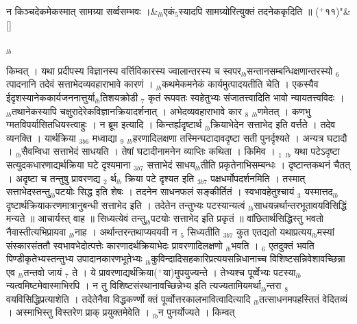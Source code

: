 \documentclass[article,12pt,a4paper]{memoir}%
\newcommand{\add}[1]{($^{+}$#1)}
\begin{document}
	    
	    \stanza[\smallbreak]
	  न किञ्चदेकमेकस्मात् सामग्र्या सर्व्वसम्भवः ।&{\tiny $_{lb}$}एकं{\tiny $_{5}$}स्यादपि सामग्र्योरित्युक्तं तदनेककृदिति ॥ \add{११}{\normalfontlatin\large\qquad{}"}\&[\smallbreak]
	  
	  
	  
	  \endgroup
	{\tiny $_{lb}$}

	  
	  \pstart \leavevmode%
	किम्वत् । यथा प्रदीपस्य विज्ञानस्य वर्त्तिविकारस्य ज्वालान्तरस्य च स्वपर{\tiny $_{lb}$}सन्तानसम्बन्धिक्षणान्तरस्यो {\tiny $_{6}$} त्पादनानि तदेवं सत्ताभेदव्यवहाराभावे कारणं । {\tiny $_{lb}$}कथमेकमनेकं कार्यमुत्पादयतीति चेति । एकस्यैव ईदृशस्यानेककार्यजननात्तुर्या{\tiny $_{lb}$}तिशयक्रोडी {\tiny $_{7}$} कृतं रूपवतः स्वहेतुभ्यः संजातत्त्वादिति भावो न्यायतत्त्वविदः । {\tiny $_{lb}$}तथानेकस्यापि चक्षुरादेरेकविज्ञानक्रियादर्शनात् । अभेदव्यवहाराभावे कार {\tiny $_{8}$} {\tiny $_{lb}$}णमेतत् । {\color{DodgerBlue3}कणभु} ग्मतविपर्यासितधियस्त्वाहुः । {\color{DodgerBlue3}न ब्रूम} इत्यादि । किन्तर्ह्यदृष्टार्थ {\tiny $_{lb}$}क्रियाभेदेन सत्ताभेद इति वर्त्तते । तदेव व्यनक्ति । यार्थक्रिया {\tiny $_{3b6}$} मध्वाद्या {\tiny $_{9}$} \leavevmode{} {\tiny $_{lb}$}हरणादिलक्षणा तस्मिन्घटादावदृष्टा सती पुनर्दृश्यते । अन्यत्र घटादौ । {\tiny $_{lb}$}सैवम्विधा सत्ताभेदं साधयति । तेषां घटादीनामनेन व्याप्तिः कथिता । किमिव । {\tiny $_{1}$} {\tiny $_{lb}$} {\color{DodgerBlue3}यथा पटेऽदृष्टा सत्युदकधारणाद्यर्थक्रिया घटे दृश्यमाना} {\tiny $_{3b7}$} सत्ताभेदं साधय{\tiny $_{lb}$}तीति प्रकृतेनाभिसम्बन्धः । दृष्टान्तकथनं चैतत् । {\color{DodgerBlue3}अदृष्टा च तन्तुषु प्रावरणद्य {\tiny $_{2}$} र्थ{\tiny $_{lb}$}\leavevmode{} क्रिया पटे दृश्यत इति} {\tiny $_{3b7}$} पक्षधर्मोपदर्शनमिति । तस्मात् सत्ताभेदस्तन्तु{\tiny $_{lb}$}पटयोः सिद्ध इति शेषः । तदनेन साधनफलं सङ्कीर्तितं । स्वभावहेतुश्चायं {\tiny $_{3}$} यस्मात्तद{\tiny $_{lb}$}दृष्टार्थक्रियाकरणमात्रानुबन्धी सत्ताभेद इति । तदेतेन तन्तुभ्यः पटस्यान्यत्वं {\tiny $_{lb}$}साधयन्नर्थान्तरभूतावयविसिद्धिं मन्यते ॥ {\color{DodgerBlue3}आचार्यस्त्} वाह ॥ {\color{DodgerBlue3}सिध्यत्येवं तन्तु{\tiny $_{lb}$}पटयोः सत्ताभेद} इति प्रकृतं ॥ वांछितार्थसिद्धिस्तु भवतो नैवास्तीत्यभिप्रायवा {\tiny $_{lb}$}नाह । {\color{DodgerBlue3}अर्थान्तरन्तथाप्यवयवी न {\tiny $_{5}$} सिध्यतीति} {\tiny $_{3b7}$} कुत एतद्यतो यथाप्रत्यय{\tiny $_{lb}$}मस्यां संस्कारसंततौ स्वभावभेदोत्पत्तेः कारणादर्थक्रियाभेदः प्रावरणादिलक्षणो {\tiny $_{lb}$}भवति । {\tiny $_{6}$} एतदुक्तं भवति पिण्डीकृतेभ्यस्तन्तुभ्य उपादानकारणभूतेभ्यः {\tiny $_{lb}$}कुविन्दादिसहकारिप्रत्ययसन्निधानाच्च विशिष्टसन्निवेशावच्छिन्ना एव {\tiny $_{lb}$}तन्तवो जायं {\tiny $_{7}$} ते । ये प्रावरणाद्यर्थक्रिया\add{या}मुपयुज्यन्ते । तेभ्यश्च पूर्व्वेभ्यः पटस्या{\tiny $_{lb}$}न्यत्वमिष्टमेवास्माभिरपि । न तु विशिष्टसंस्थानावच्छिन्नेभ्य इति त्यज्यतामियमर्था{\tiny $_{lb}$}न्तरा {\tiny $_{8}$} \leavevmode{} वयविसिद्धिप्रत्याशेति । तदेतेनैवा {\color{DodgerBlue3}विद्धकर्ण्णो} क्तं पूर्व्वोत्तरकालभावित्वादित्यादि {\tiny $_{lb}$}तत्साधनमपहस्तितं वेदितव्यं । अस्माभिस्तु विस्तरेण प्राक् प्रयुक्तमेवेति । {\tiny $_{lb}$}न पुनर्योज्यते । किम्वत् 
\end{document}
